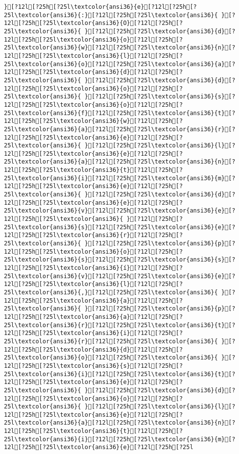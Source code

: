 \documentclass{scrartcl}
\begin{document}
\begin{Verbatim}
}[?12l[?25h[?25l\textcolor{ansi36}{e}[?12l[?25h[?25l\textcolor{ansi36}{:}[?12l[?25h[?25l\textcolor{ansi36}{ }[?12l[?25h[?25l\textcolor{ansi36}{O}[?12l[?25h[?25l\textcolor{ansi36}{ }[?12l[?25h[?25l\textcolor{ansi36}{d}[?12l[?25h[?25l\textcolor{ansi36}{o}[?12l[?25h[?25l\textcolor{ansi36}{w}[?12l[?25h[?25l\textcolor{ansi36}{n}[?12l[?25h[?25l\textcolor{ansi36}{l}[?12l[?25h[?25l\textcolor{ansi36}{o}[?12l[?25h[?25l\textcolor{ansi36}{a}[?12l[?25h[?25l\textcolor{ansi36}{d}[?12l[?25h[?25l\textcolor{ansi36}{ }[?12l[?25h[?25l\textcolor{ansi36}{d}[?12l[?25h[?25l\textcolor{ansi36}{o}[?12l[?25h[?25l\textcolor{ansi36}{ }[?12l[?25h[?25l\textcolor{ansi36}{s}[?12l[?25h[?25l\textcolor{ansi36}{o}[?12l[?25h[?25l\textcolor{ansi36}{f}[?12l[?25h[?25l\textcolor{ansi36}{t}[?12l[?25h[?25l\textcolor{ansi36}{w}[?12l[?25h[?25l\textcolor{ansi36}{a}[?12l[?25h[?25l\textcolor{ansi36}{r}[?12l[?25h[?25l\textcolor{ansi36}{e}[?12l[?25h[?25l\textcolor{ansi36}{ }[?12l[?25h[?25l\textcolor{ansi36}{l}[?12l[?25h[?25l\textcolor{ansi36}{e}[?12l[?25h[?25l\textcolor{ansi36}{a}[?12l[?25h[?25l\textcolor{ansi36}{n}[?12l[?25h[?25l\textcolor{ansi36}{t}[?12l[?25h[?25l\textcolor{ansi36}{i}[?12l[?25h[?25l\textcolor{ansi36}{m}[?12l[?25h[?25l\textcolor{ansi36}{e}[?12l[?25h[?25l\textcolor{ansi36}{ }[?12l[?25h[?25l\textcolor{ansi36}{d}[?12l[?25h[?25l\textcolor{ansi36}{e}[?12l[?25h[?25l\textcolor{ansi36}{v}[?12l[?25h[?25l\textcolor{ansi36}{e}[?12l[?25h[?25l\textcolor{ansi36}{ }[?12l[?25h[?25l\textcolor{ansi36}{s}[?12l[?25h[?25l\textcolor{ansi36}{e}[?12l[?25h[?25l\textcolor{ansi36}{r}[?12l[?25h[?25l\textcolor{ansi36}{ }[?12l[?25h[?25l\textcolor{ansi36}{p}[?12l[?25h[?25l\textcolor{ansi36}{o}[?12l[?25h[?25l\textcolor{ansi36}{s}[?12l[?25h[?25l\textcolor{ansi36}{s}[?12l[?25h[?25l\textcolor{ansi36}{í}[?12l[?25h[?25l\textcolor{ansi36}{v}[?12l[?25h[?25l\textcolor{ansi36}{e}[?12l[?25h[?25l\textcolor{ansi36}{l}[?12l[?25h[?25l\textcolor{ansi36}{,}[?12l[?25h[?25l\textcolor{ansi36}{ }[?12l[?25h[?25l\textcolor{ansi36}{a}[?12l[?25h[?25l\textcolor{ansi36}{ }[?12l[?25h[?25l\textcolor{ansi36}{p}[?12l[?25h[?25l\textcolor{ansi36}{a}[?12l[?25h[?25l\textcolor{ansi36}{r}[?12l[?25h[?25l\textcolor{ansi36}{t}[?12l[?25h[?25l\textcolor{ansi36}{i}[?12l[?25h[?25l\textcolor{ansi36}{r}[?12l[?25h[?25l\textcolor{ansi36}{ }[?12l[?25h[?25l\textcolor{ansi36}{d}[?12l[?25h[?25l\textcolor{ansi36}{o}[?12l[?25h[?25l\textcolor{ansi36}{ }[?12l[?25h[?25l\textcolor{ansi36}{s}[?12l[?25h[?25l\textcolor{ansi36}{i}[?12l[?25h[?25l\textcolor{ansi36}{t}[?12l[?25h[?25l\textcolor{ansi36}{e}[?12l[?25h[?25l\textcolor{ansi36}{ }[?12l[?25h[?25l\textcolor{ansi36}{d}[?12l[?25h[?25l\textcolor{ansi36}{o}[?12l[?25h[?25l\textcolor{ansi36}{ }[?12l[?25h[?25l\textcolor{ansi36}{l}[?12l[?25h[?25l\textcolor{ansi36}{e}[?12l[?25h[?25l\textcolor{ansi36}{a}[?12l[?25h[?25l\textcolor{ansi36}{n}[?12l[?25h[?25l\textcolor{ansi36}{t}[?12l[?25h[?25l\textcolor{ansi36}{i}[?12l[?25h[?25l\textcolor{ansi36}{m}[?12l[?25h[?25l\textcolor{ansi36}{e}[?12l[?25h[?25l

\end{Verbatim}
\end{document}
